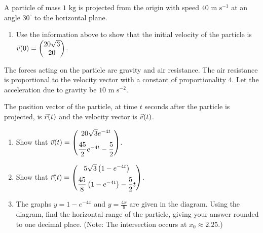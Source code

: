 
\begin{problem}
A particle of mass $1 \text{ kg}$ is projected from the origin with speed $40 \text{ m s}^{-1}$ at an angle $30^\circ$ to the horizontal plane.

\begin{enumerate}[label=(\roman*)]
    \item Use the information above to show that the initial velocity of the particle is $\vec{v}(0) = \begin{pmatrix} 20\sqrt{3} \\ 20 \end{pmatrix}$.
\end{enumerate}

The forces acting on the particle are gravity and air resistance. The air resistance is proportional to the velocity vector with a constant of proportionality $4$. Let the acceleration due to gravity be $10 \text{ m s}^{-2}$.

The position vector of the particle, at time $t$ seconds after the particle is projected, is $\vec{r}(t)$ and the velocity vector is $\vec{v}(t)$.

\begin{enumerate}[label=(\roman*), resume]
    \item Show that $\vec{v}(t) = \begin{pmatrix} 20\sqrt{3}e^{-4t} \\[6pt] \dfrac{45}{2}e^{-4t} - \dfrac{5}{2} \end{pmatrix}$.
    
    \item Show that $\vec{r}(t) = \begin{pmatrix} 5\sqrt{3}\left(1 - e^{-4t}\right) \\[6pt] \dfrac{45}{8}\left(1 - e^{-4t}\right) - \dfrac{5}{2}t \end{pmatrix}$.
    
    \item The graphs $y = 1 - e^{-4x}$ and $y = \frac{4x}{9}$ are given in the diagram. Using the diagram, find the horizontal range of the particle, giving your answer rounded to one decimal place. (Note: The intersection occurs at $x_0 \approx 2.25$.)
\end{enumerate}
\end{problem}

